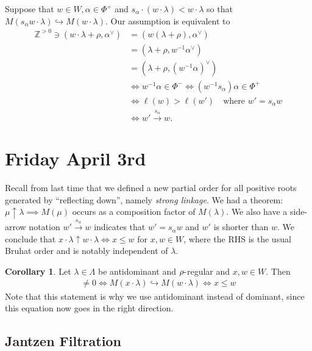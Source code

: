 \documentclass[11pt]{scrartcl}
\theoremstyle{definition}
\theoremstyle{theorem}
\newtheorem{corollary}[theorem]{Corollary}
\theoremstyle{proof}
\theoremstyle{definition}
\theoremstyle{break}
\theoremstyle{problem}
\newcommand{\ZZ}[0]{{\mathbb{Z}}}
\newcommand{\dash}[0]{{\hbox{-}}}
\newcommand{\dual}[0]{^\vee}
\newcommand{\injects}[0]{\hookrightarrow}
\newcommand{\inv}[0]{^{-1}}
\newcommand{\mapsvia}[1]{\xrightarrow{#1}}
\begin{document}
Suppose that \(w\in W, \alpha\in\Phi^+\) and
\(s_\alpha \cdot (w\cdot \lambda) < w\cdot \lambda\) so that
\(M(s_\alpha w \cdot \lambda) \injects M(w\cdot \lambda)\). Our
assumption is equivalent to \begin{align*}
\ZZ^{>0} \ni (w\cdot \lambda + \rho, \alpha\dual) 
&= (w(\lambda+\rho), \alpha\dual)\\
&= (\lambda + \rho, w\inv \alpha\dual) \\
&= (\lambda + \rho, (w\inv\alpha)\dual) \\
&\iff w\inv \alpha \in \Phi^- \iff (w\inv s_\alpha) \alpha \in \Phi^+ \\
&\iff \ell(w) > \ell(w') \quad \text{where } w' = s_\alpha w \\
&\iff w' \mapsvia{s_\alpha} w
.\end{align*}

\hypertarget{friday-april-3rd}{%
\section{Friday April 3rd}\label{friday-april-3rd}}

Recall from last time that we defined a new partial order for all
positive roots generated by ``reflecting down'', namely \emph{strong
linkage}. We had a theorem: \(\mu \uparrow \lambda \implies M(\mu)\)
occurs as a composition factor of \(M(\lambda)\). We also have a
side-arrow notation \(w' \mapsvia{s_\alpha} w\) indicates that
\(w' = s_\alpha w\) and \(w'\) is shorter than \(w\). We conclude that
\(x\cdot \lambda \uparrow w\cdot \lambda \iff x\leq w\) for
\(x, w\in W\), where the RHS is the usual Bruhat order and is notably
independent of \(\lambda\).

\begin{corollary}

Let \(\lambda \in \Lambda\) be antidominant and \(\rho\dash\)regular and
\(x, w\in W\). Then
\begin{align*}
[M(w\cdot \lambda) : L(x\cdot \lambda)] \neq 0 \iff M(x\cdot \lambda) \injects M(w\cdot \lambda) \iff x \leq w
\end{align*} Note that this statement is why we use antidominant instead
of dominant, since this equation now goes in the right
direction.\end{corollary}

\hypertarget{jantzen-filtration}{%
\subsection{Jantzen Filtration}\label{jantzen-filtration}}
\end{document}
